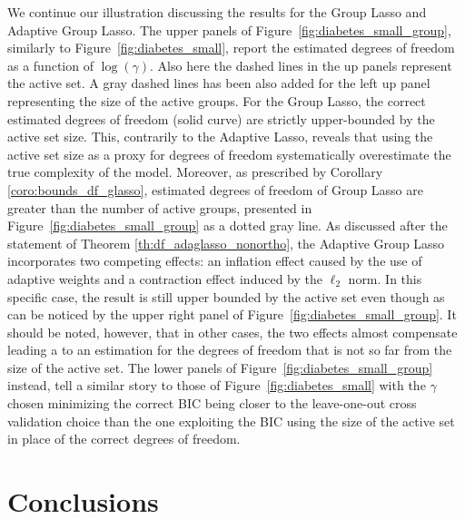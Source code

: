 \documentclass[a4paper, 12pt]{article}
\begin{document}
We continue our illustration discussing the results for the Group Lasso and Adaptive Group Lasso. The upper panels of Figure~\ref{fig:diabetes_small_group}, similarly to  Figure~\ref{fig:diabetes_small},  report the estimated degrees of freedom as a function of $\log(\gamma)$. Also here the  dashed lines in the up panels represent the active set. A gray dashed lines has been also added for the left up panel representing the size of the active groups.  For the Group Lasso, the correct estimated degrees of freedom (solid curve) are strictly upper-bounded by the active set size. This, contrarily to the Adaptive Lasso, reveals that using the active set size as a proxy for degrees of freedom systematically overestimate the true complexity of the model. {Moreover, as prescribed by Corollary \ref{coro:bounds_df_glasso}, estimated degrees of freedom of Group Lasso are greater than the number of active groups, presented in Figure~\ref{fig:diabetes_small_group} as a dotted gray line.} As discussed after the statement of Theorem \ref{th:df_adaglasso_nonortho}, the Adaptive Group Lasso  incorporates two competing effects: an inflation effect caused by the use of adaptive weights and a contraction effect induced by the $\ell_2$ norm. In this specific case, the result is still upper bounded by the active set even though as can be noticed by the upper right panel of Figure~\ref{fig:diabetes_small_group}. It should be noted, however, that in  other cases, the two effects almost compensate leading a to an estimation for the degrees of freedom that is not so far from the size of the active set. The lower panels of Figure~\ref{fig:diabetes_small_group} instead, tell a similar story to those of Figure~\ref{fig:diabetes_small} with the $\gamma$ chosen minimizing the correct BIC being closer to the leave-one-out cross validation choice than the one exploiting the BIC using the size of the active set in place of the correct degrees of freedom. 

\section{Conclusions}
\label{sec:conclusions}
\end{document}
